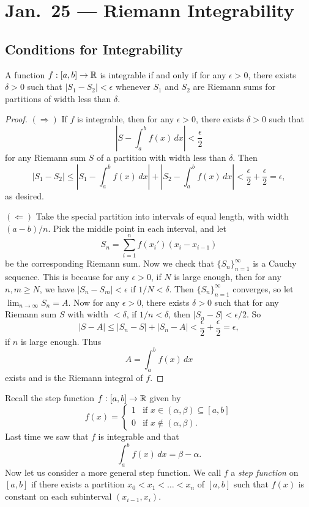 \chapter{Jan.~25 --- Riemann Integrability}

\section{Conditions for Integrability}
\begin{lemma}
  A function $f : [a, b] \to \mathbb{R}$ is integrable if and only if
  for any $\epsilon > 0$, there exists $\delta > 0$
  such that $|S_1 - S_2| < \epsilon$ whenever $S_1$
  and $S_2$ are Riemann sums for partitions of
  width less than $\delta$.
  \label{lem:first-integrable}
\end{lemma}

\begin{proof}
  $(\Rightarrow)$ If $f$ is integrable, then for
  any $\epsilon > 0$, there exists $\delta > 0$ such that
  \[
    \left|S - \int_a^b f(x)\, dx\right| < \frac{\epsilon}{2}
  \]
  for any Riemann sum $S$ of a partition with width
  less than $\delta$. Then
  \[
    |S_1 - S_2| \le
    \left|S_1 - \int_a^b f(x)\, dx\right| +
    \left|S_2 - \int_a^b f(x)\, dx\right| <
    \frac{\epsilon}{2} + \frac{\epsilon}{2} = \epsilon,
  \]
  as desired.

  $(\Leftarrow)$ Take the special partition into intervals
  of equal length, with width $(a - b) / n$. Pick
  the middle point in each interval, and let
  \[
    S_n = \sum_{i = 1}^n f(x_i') (x_i - x_{i - 1})
  \]
  be the corresponding Riemann sum. Now we check that
  $\{S_n\}_{n = 1}^\infty$ is a Cauchy sequence. This is
  because for any $\epsilon > 0$, if $N$ is large
  enough, then for any $n, m \ge N$, we have
  $|S_n - S_m| < \epsilon$ if $1 / N < \delta$. Then
  $\{S_n\}_{n = 1}^\infty$ converges, so let
  $\lim_{n \to \infty} S_n = A$. Now for any
  $\epsilon > 0$, there exists $\delta > 0$ such that
  for any Riemann sum $S$ with width $< \delta$,
  if $1 / n < \delta$, then $|S_n - S| < \epsilon / 2$.
  So
  \[
    |S - A| \le |S_n - S| + |S_n - A|
    < \frac{\epsilon}{2} + \frac{\epsilon}{2} = \epsilon,
  \]
  if $n$ is large enough. Thus
  \[
    A = \int_a^b f(x)\, dx
  \]
  exists and is the Riemann integral of $f$.
\end{proof}

\begin{remark}
Recall the step function $f : [a, b] \to \mathbb{R}$ given by
\[
  f(x) =
  \begin{cases}
    1 & \text{if } x \in (\alpha, \beta) \subseteq [a, b] \\
    0 & \text{if } x \notin (\alpha, \beta).
  \end{cases}
\]
Last time we saw that $f$ is integrable and that
\[
  \int_a^b f(x)\, dx = \beta - \alpha.
\]
Now let us consider a more general step function. We
call $f$ a \emph{step function} on $[a, b]$ if there
exists
a partition $x_0 < x_1 < \dots < x_n$ of $[a, b]$ such
that $f(x)$ is constant on each subinterval
$(x_{i - 1}, x_i)$.
\end{remark}


